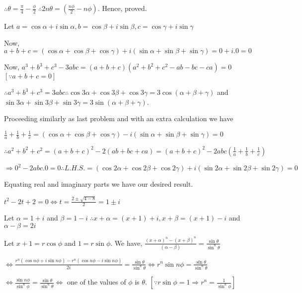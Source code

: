   $\therefore \theta = \frac{\pi}{4} - \frac{\phi}{2}\;\therefore 2n\theta = \left(\frac{n\phi}{2} -
  n\phi\right)$. Hence, proved.
\item Let $a = \cos\alpha + i \sin\alpha, b = \cos\beta + i \sin\beta, c = \cos\gamma + i \sin\gamma$

  Now, $a + b + c = (\cos\alpha + \cos\beta + \cos\gamma) + i(\sin\alpha + \sin\beta + \sin\gamma) = 0 +
  i.0 = 0$

  Now, $a^3 + b^3 + c^3 - 3abc = (a + b + c)(a^2 + b^2 + c^2 - ab - bc - ca) = 0$ $[\because a + b + c = 0]$

  $\therefore a^3 + b^3 + c^3 = 3abc\therefore \cos3\alpha + \cos3\beta + \cos3\gamma = 3\cos(\alpha +
  \beta + \gamma)$ and $\sin3\alpha + \sin3\beta + \sin3\gamma = 3\sin(\alpha + \beta + \gamma)$.
\item Proceeding similarly as last problem and with an extra calculation we have

  $\frac{1}{a} + \frac{1}{b} + \frac{1}{c} = (\cos\alpha + \cos\beta + \cos\gamma) - i(\sin\alpha +
  \sin\beta + \sin\gamma) = 0$

  $\therefore a^2 + b^2 + c^2 = (a + b + c)^2 - 2(ab + bc + ca) = (a + b + c)^2 - 2 abc\left(\frac{1}{a} +
  \frac{1}{b} + \frac{1}{c}\right)$

  $\Rightarrow 0^2 - 2abc.0 = 0\therefore L.H.S. = (\cos2\alpha + \cos2\beta + \cos2\gamma) + i(\sin2\alpha
  + \sin2\beta + \sin2\gamma) = 0$

  Equating real and imaginary parts we have our desired result.
\item $t^2 -2t + 2 = 0 \Leftrightarrow t = \frac{2 \pm \sqrt{4 - 8}}{2} = 1 \pm i$

  Let $\alpha = 1+ i$ and $\beta = 1 - i\;\therefore x + \alpha = (x + 1) + i, x + \beta = (x + 1) - i$
  and $\alpha - \beta = 2i$

  Let $x + 1 = r\cos\phi$ and $1 = r\sin\phi$. We have, $\frac{(x + \alpha)^n - (x + \beta)^n}{(\alpha -
    \beta)} = \frac{\sin\theta}{\sin^n\theta}$

 $ \Leftrightarrow \frac{r^n(\cos n\phi + i \sin n\phi) - r^n(\cos n\phi - i\sin n\phi)}{2i} =
  \frac{\sin\theta}{\sin^n\theta} \Leftrightarrow r^n \sin n\phi = \frac{\sin\theta}{\sin^n\theta}$

  $\Leftrightarrow \frac{\sin n\phi}{\sin^n\phi} = \frac{\sin\theta}{\sin^n\theta} \Leftrightarrow$ one of
  the values of $\phi$ is $\theta$. $\left[\because r\sin\phi = 1\Rightarrow r^n =
    \frac{1}{\sin^n\phi}\right]$

